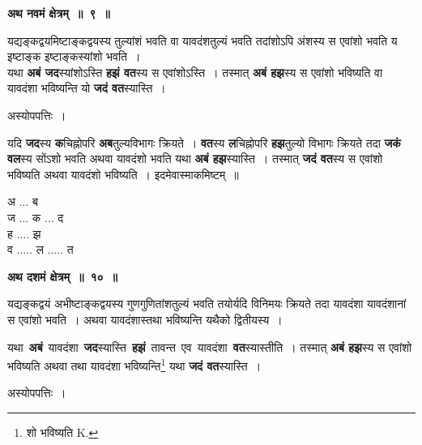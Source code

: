 \documentclass[11pt, openany]{book}
\begin{document}
\begin{center}
\textbf{अथ नवमं क्षेत्रम्~॥~९~॥}
\end{center}

{\ab यद्यङ्कद्वयमिष्टाङ्कद्वयस्य तुल्यांशं भवति वा यावदंशतुल्यं भवति तदांशोऽपि अंशस्य स एवांशो भवति य इष्टाङ्क इष्टाङ्कस्यांशो भवति~। }\\

 यथा \textbf{अबं जद}स्यांशोऽस्ति \textbf{हझं वत}स्य स एवांशोऽस्ति~। तस्मात् \textbf{अबं हझ}स्य स एवांशो भविष्यति वा यावदंशा भविष्यन्ति यो \textbf{जदं वत}स्यास्ति~। 

\begin{center}
अस्योपपत्तिः~।
\end{center}

\begin{flushleft}
\begin{minipage}[t]{0.64\textwidth}
\hspace{4mm} यदि \textbf{जद}स्य \textbf{क}चिह्नोपरि \textbf{अब}तुल्यविभागः क्रियते~। \textbf{वत}स्य  \textbf{ल}चिह्नोपरि \textbf{हझ}तुल्यो विभागः क्रियते तदा \textbf{जकं वल}स्य सोंऽशो भवति 
अथवा यावदंशो भवति यथा \textbf{अबं हझ}स्यास्ति~। तस्मात् \textbf{जदं वत}स्य स एवांशो भविष्यति अथवा यावदंशो भविष्यति~। इदमेवास्माकमिष्टम्~॥
\end{minipage} 
\hfill
\begin{minipage}[t]{0.28\textwidth}
अ ... ब\\
ज ... क ... द\\
ह .... झ\\
व ..... ल ..... त
\end{minipage}
\end{flushleft}
\vspace{-1mm}

\begin{center}
\textbf{\large अथ दशमं क्षेत्रम्~॥~१०~॥}
\end{center}

{\ab यद्यङ्कद्वयं अभीष्टाङ्कद्वयस्य गुणगुणितांशतुल्यं भवति तयोर्यदि विनिमयः क्रियते तदा यावदंशा यावदंशानां स एवांशो भवति~। अथवा यावदंशास्तथा भविष्यन्ति यथैको द्वितीयस्य~। }

\newpage
यथा \,\textbf{अबं} \,यावदंशा \,\textbf{जद}स्यास्ति \,\textbf{हझं} \,तावन्त \,एव \,यावदंशा \,\textbf{वत}स्यास्तीति~। तस्मात् \textbf{अबं हझ}स्य स एवांशो भविष्यति अथवा तथा यावदंशा भविष्यन्ति\renewcommand{\thefootnote}{१}\footnote{शो भविष्यति {\en K.}} यथा \textbf{जदं वत}स्यास्ति~। 

\begin{center}
अस्योपपत्तिः~।
\end{center}
\end{document}
